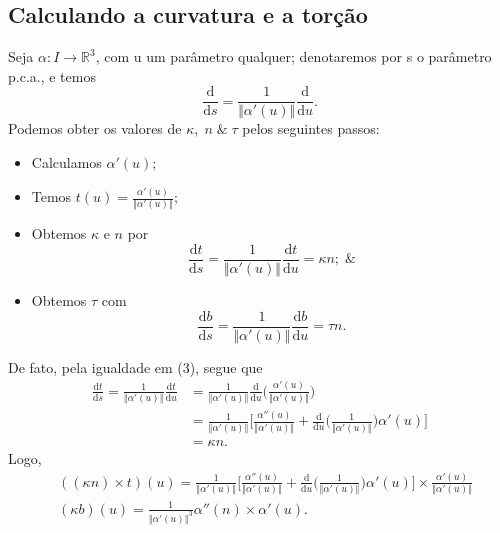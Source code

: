 \documentclass[../differential_geometry.tex]{subfiles}
\begin{document}
\subsection{Calculando a curvatura e a torção}
Seja \(\alpha :I\rightarrow \mathbb{R}^{3}\), com u um parâmetro qualquer; denotaremos por s o parâmetro p.c.a., e temos
\[
	\frac{\mathrm{d}}{\mathrm{d}s} = \frac{1}{\Vert \alpha '(u) \Vert}\frac{\mathrm{d}}{\mathrm{d}u}.
\]
Podemos obter os valores de \(\kappa , \; n \;\&\; \tau \) pelos seguintes passos:
\begin{itemize}
	\item[1)] Calculamos \(\alpha '(u)\);
	\item[2)] Temos \(t(u)=\frac{\alpha '(u)}{\Vert \alpha '(u) \Vert}\);
	\item[3)] Obtemos \(\kappa \) e \(n\) por
	      \[
		      \frac{\mathrm{d}t}{\mathrm{d}s}=\frac{1}{\Vert \alpha '(u) \Vert}\frac{\mathrm{d}t}{\mathrm{d}u} = \kappa n;\;\&
	      \]
	\item[4)] Obtemos \(\tau \) com
	      \[
		      \frac{\mathrm{d}b}{\mathrm{d}s}=\frac{1}{\Vert \alpha '(u) \Vert}\frac{\mathrm{d}b}{\mathrm{d}u}=\tau n.
	      \]
\end{itemize}
De fato, pela igualdade em (3), segue que
\begin{align*}
	\frac{\mathrm{d}t}{\mathrm{d}s} = \frac{1}{\Vert \alpha '(u) \Vert}\frac{\mathrm{d}t}{\mathrm{d}u} & = \frac{1}{\Vert \alpha '(u) \Vert}\frac{\mathrm{d}}{\mathrm{d}u}\biggl(\frac{\alpha '(u)}{\Vert \alpha '(u) \Vert}\biggr)                                                              \\
	                                                                                                   & = \frac{1}{\Vert \alpha '(u) \Vert}\biggl[\frac{\alpha ''(u)}{\Vert \alpha '(u) \Vert} + \frac{\mathrm{d}}{\mathrm{d}u}\biggl(\frac{1}{\Vert \alpha '(u) \Vert}\biggr)\alpha'(u)\biggr] \\
	                                                                                                   & =\kappa n.
\end{align*}
Logo,
\begin{align*}
	 & ((\kappa n)\times t)(u)=\frac{1}{\Vert \alpha '(u) \Vert}\biggl[\frac{\alpha ''(u)}{\Vert \alpha '(u) \Vert} + \frac{\mathrm{d}}{\mathrm{d}u}\biggl(\frac{1}{\Vert \alpha '(u) \Vert}\biggr)\alpha '(u)\biggr] \times \frac{\alpha '(u)}{\Vert \alpha '(u) \Vert} \\
	 & (\kappa b)(u)= \frac{1}{\Vert \alpha '(u) \Vert^{3}}\alpha ''(n)\times \alpha '(u).
\end{align*}
\end{document}
